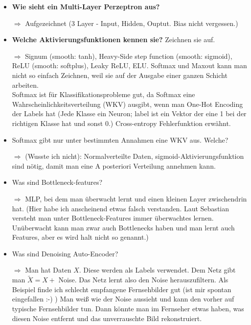 \documentclass[a4paper]{article}
\begin{document}
\begin{itemize}
        \item \textbf{Wie sieht ein Multi-Layer Perzeptron aus?}
        \item[$\Rightarrow$] Aufgezeichnet (3 Layer - Input, Hidden, Ouptut. Bias nicht vergessen.)
        \item \textbf{Welche Aktivierungsfunktionen kennen sie?} Zeichnen sie auf.
        \item[$\Rightarrow$] Signum (smooth: tanh), Heavy-Side step function (smooth: sigmoid),
                             ReLU (smooth: softplus), Leaky ReLU, ELU. Softmax
                             und Maxout kann man nicht so einfach Zeichnen,
                             weil sie auf der Ausgabe einer ganzen Schicht
                             arbeiten.\\
                             Softmax ist für Klassifikationsprobleme gut, da
                             Softmax eine Wahrscheinlichkeitsverteilung (WKV) ausgibt,
                             wenn man One-Hot Encoding der Labels hat
                             (Jede Klasse ein Neuron; label ist ein Vektor der
                             eine 1 bei der richtigen Klasse hat und sonst 0.)
                             Cross-entropy Fehlerfunktion erwähnt.
        \item Softmax gibt nur unter bestimmten Annahmen eine WKV aus. Welche?
        \item[$\Rightarrow$] (Wusste ich nicht): Normalverteilte Daten,
                             sigmoid-Aktivierungsfunktion sind nötig, damit
                             man eine A posteriori Verteilung annehmen kann.
        \item Was sind Bottleneck-features?
        \item[$\Rightarrow$] MLP, bei dem man überwacht lernt und einen kleinen
                             Layer zwischendrin hat.
                             (Hier habe ich anscheinend etwas falsch verstanden.
                              Laut Sebastian versteht man unter Bottleneck-Features
                              immer überwachtes lernen. Unüberwacht kann man
                              zwar auch Bottlenecks haben und man lernt auch
                              Features, aber es wird halt nicht so genannt.)
        \item Was sind Denoising Auto-Encoder?
        \item[$\Rightarrow$] Man hat Daten $X$. Diese werden als Labels
                             verwendet. Dem Netz gibt man $\tilde X = X + $
                             Noise. Das Netz lernt also den Noise
                             herauszufiltern. Als Beispiel finde ich schlecht
                             empfangene Fernsehbilder gut (ist mir spontan eingefallen :-) )
                             Man weiß wie der Noise aussieht und kann den
                             vorher auf typische Fernsehbilder tun.
                             Dann könnte man im Fernseher etwas haben, was
                             diesen Noise entfernt und das unverrauschte Bild
                             rekonstruiert.
    \end{itemize}
\end{document}

